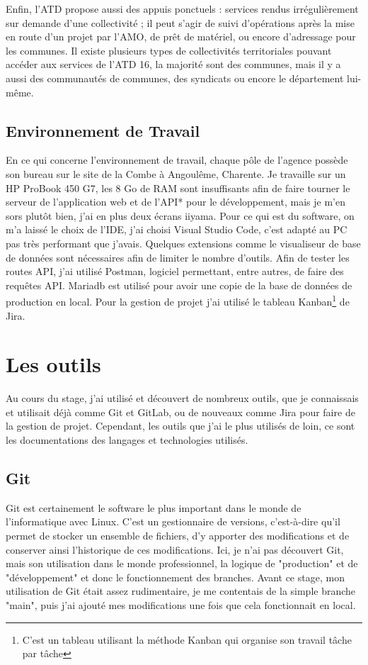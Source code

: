 \documentclass[a4paper,12pt]{report}
\begin{document}
Enfin, l'ATD propose aussi des appuis ponctuels : services rendus irrégulièrement sur demande d'une collectivité ; il peut s'agir de suivi d'opérations après la mise en route d'un projet par l'AMO, de prêt de matériel, ou encore d'adressage pour les communes. Il existe plusieurs types de collectivités territoriales pouvant accéder aux services de l'ATD 16, la majorité sont des communes, mais il y a aussi des communautés de communes, des syndicats ou encore le département lui-même.



\subsection{Environnement de Travail}

En ce qui concerne l'environnement de travail, chaque pôle de l'agence possède son bureau sur le site de la Combe à Angoulême, Charente. Je travaille sur un HP ProBook 450 G7, les 8 Go de RAM sont insuffisants afin de faire tourner le serveur de l'application web et de l'API* pour le développement, mais je m'en sors plutôt bien, j'ai en plus deux écrans iiyama. Pour ce qui est du software, on m'a laissé le choix de l'IDE, j'ai choisi Visual Studio Code, c'est adapté au PC pas très performant que j'avais. Quelques extensions comme le visualiseur de base de données sont nécessaires afin de limiter le nombre d'outils. Afin de tester les routes API, j'ai utilisé Postman, logiciel permettant, entre autres, de faire des requêtes API. Mariadb est utilisé pour avoir une copie de la base de données de production en local. Pour la gestion de projet j'ai utilisé le tableau Kanban\footnote{C'est un tableau utilisant la méthode Kanban qui organise son travail tâche par tâche} de Jira.

\section{Les outils}
Au cours du stage, j'ai utilisé et découvert de nombreux outils, que je connaissais et utilisait déjà comme Git et GitLab, ou de nouveaux comme Jira pour faire de la gestion de projet. Cependant, les outils que j'ai le plus utilisés de loin, ce sont les documentations des langages et technologies utilisés.

\subsection{Git}
Git est certainement le software le plus important dans le monde de l'informatique avec Linux. C'est un gestionnaire de versions, c'est-à-dire qu'il permet de stocker un ensemble de fichiers, d'y apporter des modifications et de conserver ainsi l'historique de ces modifications. Ici, je n'ai pas découvert Git, mais son utilisation dans le monde professionnel, la logique de "production" et de "développement" et donc le fonctionnement des branches. Avant ce stage, mon utilisation de Git était assez rudimentaire, je me contentais de la simple branche "main", puis j'ai ajouté mes modifications une fois que cela fonctionnait en local.
\end{document}
